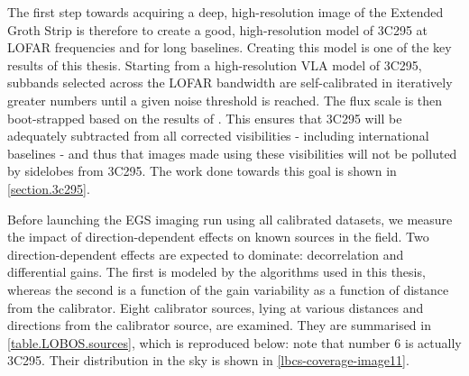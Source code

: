 \pg
The first step towards acquiring a deep, high-resolution image of the Extended Groth Strip is therefore to create a good, high-resolution model of 3C295 at LOFAR frequencies and for long baselines. Creating this model is one of the key results of this thesis. Starting from a high-resolution VLA model of 3C295, subbands selected across the LOFAR bandwidth are self-calibrated in iteratively greater numbers until a given noise threshold is reached. The flux scale is then boot-strapped based on the results of \citet{arse}. This ensures that 3C295 will be adequately subtracted from all corrected visibilities - including international baselines - and thus that images made using these visibilities will not be polluted by sidelobes from 3C295. 
The work done towards this goal is shown in \cref{section.3c295}. %
%

\pg
Before launching the EGS imaging run using all calibrated datasets, we measure the impact of direction-dependent effects on known sources in the field. Two direction-dependent effects are expected to dominate: decorrelation and differential gains. The first is modeled by the algorithms used in this thesis, whereas the second is a function of the gain variability as a function of distance from the calibrator. Eight calibrator sources, lying at various distances and directions from the calibrator source, are examined. They are summarised in \cref{table.LOBOS.sources}, which is reproduced below: note that number 6 is actually 3C295. Their distribution in the sky is shown in \cref{lbcs-coverage-image11}.

